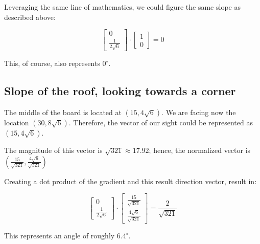 \documentclass[letterpaper]{article}
\begin{document}
Leveraging the same line of mathematics, we could figure the same slope as described above:

\begin{equation}
     \begin{bmatrix}
0 \\
\frac{1}{2\sqrt{6}}
    \end{bmatrix}
\cdot
    \begin{bmatrix}
1 \\
0
    \end{bmatrix} = 0
\end{equation}

This, of course, also represents \(0^{\circ}\).

\subsection{Slope of the roof, looking towards a corner}
\label{sec:orgbf53d26}
The middle of the board is located at \((15, 4\sqrt{6})\). We are facing now the location \((30, 8\sqrt{6})\). Therefore, the vector of our sight could be represented as \((15, 4\sqrt{6})\).

The magnitude of this vector is \(\sqrt{321} \approx 17.92\); hence, the normalized vector is \((\frac{15}{\sqrt{321}}, \frac{4 \sqrt{6}}{\sqrt{321}})\)

Creating a dot product of the gradient and this result direction vector, result in:

\begin{equation}
     \begin{bmatrix}
0 \\
\frac{1}{2\sqrt{6}}
    \end{bmatrix}
\cdot
    \begin{bmatrix}
\frac{15}{\sqrt{321}}\\
\frac{4 \sqrt{6}}{\sqrt{321}}
    \end{bmatrix} = \frac{2}{\sqrt{321}}
\end{equation}

This represents an angle of roughly \(6.4^{\circ}\).
\end{document}

